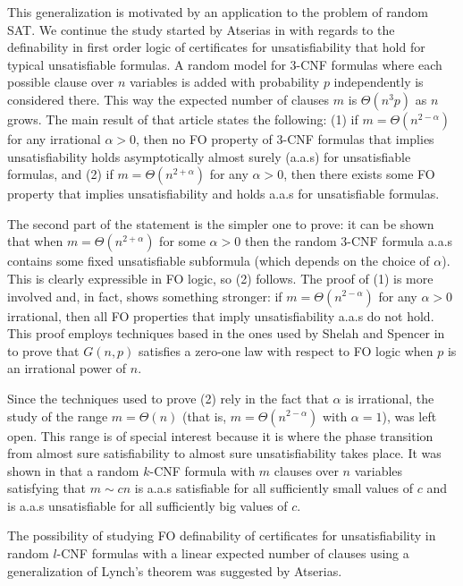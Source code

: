 \documentclass[12pt,notitlepage,a4paper]{article}
\theoremstyle{definition}
\begin{document}
This generalization is motivated by an application to the problem of random 
SAT. We continue the study started by Atserias in 
\cite{atserias2005definability}
with regards to the definability in first order
logic of certificates for unsatisfiability
that hold for typical unsatisfiable formulas. 
A random model for $3$-CNF formulas where 
each possible clause over $n$ variables 
is added with probability $p$ independently is considered there.
This way the expected number of clauses $m$ is $\Theta(n^3p)$ as $n$ grows.
The main result of that article states the following:
(1) if $m=\Theta(n^{2-\alpha})$ 
for any irrational $\alpha>0$, then no FO property of $3$-CNF formulas
that implies unsatisfiability holds asymptotically almost surely (a.a.s) 
for unsatisfiable formulas, and (2) if $m=\Theta(n^{2+\alpha})$ for any $\alpha>0$,
then there exists some FO property that implies
unsatisfiability and  holds a.a.s for unsatisfiable formulas. \par
The second part of the statement is the simpler one to prove:
it can be shown that when $m=\Theta(n^{2+\alpha})$ for some 
$\alpha>0$ then the random $3$-CNF formula
a.a.s contains some fixed unsatisfiable subformula (which depends
on the choice of $\alpha$). This is clearly expressible in FO logic, 
so (2) follows. The proof of (1) is more involved and, in fact, 
shows something stronger: if $m=\Theta(n^{2-\alpha})$
for any $\alpha>0$ irrational, then all FO properties 
that imply unsatisfiability
a.a.s do not hold. This proof employs
techniques based in the ones used by Shelah and Spencer 
in \cite{shelah1988zero} to prove that $G(n,p)$ satisfies a 
zero-one law with respect to FO logic when $p$ is an irrational 
power of $n$. \par
Since the techniques used to prove (2) rely in the fact that $\alpha$
is irrational, the study of the range $m=\Theta(n)$
(that is, $m=\Theta(n^{2-\alpha})$ with $\alpha=1$), was left open.
This range is of special interest because it is where the phase 
transition from almost sure satisfiability to almost sure unsatisfiability
takes place. It was shown
in \cite{chvatal1992mick} that a random $k$-CNF formula with
$m$ clauses over $n$ variables satisfying that $m\sim c  n$ 
is a.a.s satisfiable for all sufficiently small values of $c$ and is a.a.s
unsatisfiable for all sufficiently big values of $c$.
\par
The possibility of studying FO definability of certificates for unsatisfiability
in random $l$-CNF formulas with a linear expected number of clauses 
using a generalization of Lynch's theorem was suggested by Atserias. 
\end{document}
